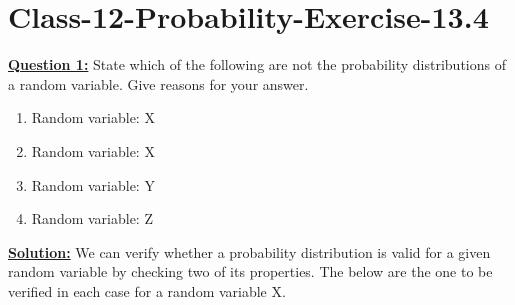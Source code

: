 \documentclass[journal,12pt,twocolumn]{IEEEtran}
\begin{document}
	\section{Class-12-Probability-Exercise-13.4} \par\textbf{\underline{Question 1:}} State which of the following are not the probability distributions of a random variable. Give reasons for your answer.
	\begin{enumerate}[label=(\roman*)]
    \item Random variable: X
    \begin{table}[!h] 
	      
	      \end{table}
	      \item Random variable: X
    \begin{table}[!h] 
	      
	      \end{table}
	      \item Random variable: Y
    \begin{table}[!h] 
	      
	      \end{table}
	      \item Random variable: Z
    \begin{table}[!h] 
	      
	      \end{table}
	\end{enumerate}
	\par\textbf{\underline{Solution:} }We can verify whether a probability distribution is valid for a given random variable by checking two of its properties. The below are the one to be verified in each case for a random variable X.\\
	\\
\\
\\
\end{document}
